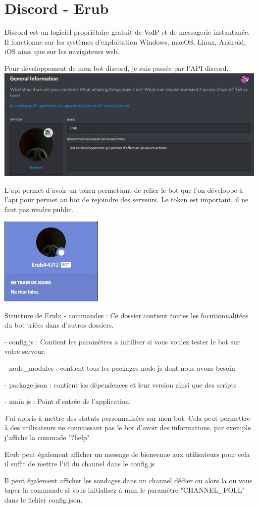\section{Discord - Erub}

Discord est un logiciel propriétaire gratuit de VoIP et de messagerie instantanée. Il fonctionne sur les systèmes d’exploitation Windows, macOS, Linux, Android, iOS ainsi que sur les navigateurs web.

Pour développement de mon bot discord, je suis passée par l'API discord.\\

\includegraphics[width=16cm]{img/api.jpg}	

L'api permet d'avoir un token permettant de relier le bot que l'on développe à l'api pour permet au bot de rejoindre des serveurs. Le token est important, il ne faut pas rendre public.

\includegraphics[width=5cm]{img/Erub.jpg}	

Structure de Erub: 
- commandes : Ce dossier contient toutes les focntionnalitées du bot triées dans d'autres dossiers.

- config.js : Contient les paramètres a initiliser si vous voulez tester le bot sur votre serveur.

- node\_modules : contient tous les packages node js dont nous avons besoin

- package.json : contient les dépendences et leur version ainsi que des scripts

- main.js : Point d'entrée de l'application.

J'ai appris à mettre des statuts personnalisées sur mon bot. 
Cela peut permettre à des utilisateurs ne connaissant pas le bot d'avoir des informations, par exemple j'affiche la commade "?help"

Erub peut également afficher un message de bienvenue aux utilisateurs pour cela il suffit de mettre l'id du channel dans le config.js

Il peut également afficher les sondages dans un channel dédier ou alors la ou vous taper la commande si vous initialisez à num le paramètre "CHANNEL\_POLL" dans le fichier config.json.
